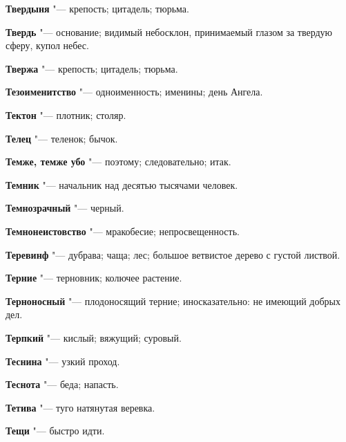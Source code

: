 \begin{mymulticols}{2}
\noindent\textbf{Твердыня} "--- крепость; цитадель; тюрьма. 




\noindent\textbf{Твердь} "--- основание; видимый небосклон, принимаемый глазом за твердую сферу, купол небес. 




\noindent\textbf{Твержа} "--- крепость; цитадель; тюрьма. 




\noindent\textbf{Тезоименитство} "--- одноименность; именины; день Ангела. 




\noindent\textbf{Тектон} "--- плотник; столяр. 




\noindent\textbf{Телец} "--- теленок; бычок. 




\noindent\textbf{Темже, темже убо} "--- поэтому; следовательно; итак. 




\noindent\textbf{Темник} "--- начальник над десятью тысячами человек. 




\noindent\textbf{Темнозрачный} "--- черный. 




\noindent\textbf{Темнонеистовство} "--- мракобесие; непросвещенность. 




\noindent\textbf{Теревинф} "--- дубрава; чаща; лес; большое ветвистое дерево с густой листвой. 




\noindent\textbf{Терние} "--- терновник; колючее растение. 




\noindent\textbf{Терноносный} "--- плодоносящий терние; иносказательно: не имеющий добрых дел. 




\noindent\textbf{Терпкий} "--- кислый; вяжущий; суровый. 




\noindent\textbf{Теснина} "--- узкий проход. 




\noindent\textbf{Теснота} "--- беда; напасть. 




\noindent\textbf{Тетива} "--- туго натянутая веревка. 




\noindent\textbf{Тещи} "--- быстро идти. 





\end{mymulticols}
